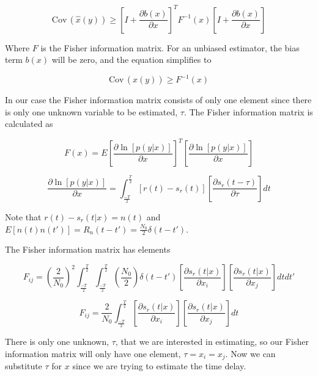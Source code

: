 \documentclass[11pt]{article}
\def\Cov{{\textrm{Cov}}\,}
\begin{document}
\begin{equation}
\Cov(\hat{x}(y))
\geq
\left[I + \frac{\partial b(x)}{\partial x}\right]^T F^{-1}(x) \left[I + \frac{\partial b(x)}{\partial x}\right]
\end{equation}

Where $F$ is the Fisher information matrix. For an unbiased estimator, the bias term $b(x)$ will be zero, and the equation simplifies to

\begin{equation}
\Cov(\hat{x}(y))
\geq
F^{-1}(x)
\end{equation}

In our case the Fisher information matrix consists of only one element since there is only one unknown variable to be estimated, $\tau$. The Fisher information matrix is calculated as

\begin{equation}
F(x) = E\left[ \frac{\partial \ln [p(y|x)]}{\partial x} \right]^T
\left[ \frac{\partial \ln [p(y|x)]}{\partial x} \right]
\end{equation}

\begin{equation}
\frac{\partial \ln [p(y|x)]}{\partial x} 
=
\int^\frac{T}{2}_\frac{-T}{2}
\left[ r(t) - s_r(t) \right]
\left[ \frac{\partial s_r(t-\tau)}{\partial \tau} \right] dt
\end{equation}

Note that $r(t) - s_r(t|x) = n(t)$ and $E[n(t)n(t')]=R_n(t-t')=\frac{N_0}{2}\delta(t-t')$.


The Fisher information matrix has elements

\begin{equation}
F_{ij}
=
\left( \frac{2}{N_0} \right)^2
\int^\frac{T}{2}_\frac{-T}{2} \int^\frac{T}{2}_\frac{-T}{2}
\left( \frac{N_0}{2} \right)
\delta (t - t')
\left[ \frac{\partial s_r(t|x)}{\partial x_i} \right]
\left[ \frac{\partial s_r(t|x)}{\partial x_j} \right]
dt dt'
\end{equation}

\begin{equation}
F_{ij}
=
\frac{2}{N_0}
\int^\frac{T}{2}_\frac{-T}{2}
\left[ \frac{\partial s_r(t|x)}{\partial x_i} \right]
\left[ \frac{\partial s_r(t|x)}{\partial x_j} \right]
dt
\end{equation}

There is only one unknown, $\tau$, that we are interested in estimating, so our Fisher information matrix will only have one element, $\tau = x_i = x_j$. Now we can substitute $\tau$ for $x$ since we are trying to estimate the time delay.
\end{document}
